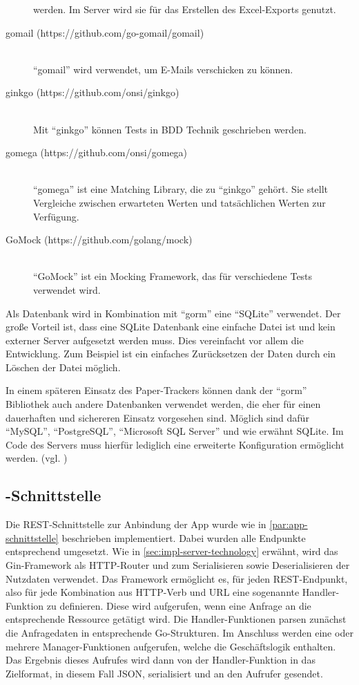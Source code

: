 \begin{description}
		werden. Im Server wird sie für das Erstellen des Excel-Exports genutzt.
	\item[gomail (https://github.com/go-gomail/gomail)] \hfill \\
		\enquote{gomail} wird verwendet, um E-Mails verschicken zu können.
	\item[ginkgo (https://github.com/onsi/ginkgo)] \hfill \\
		Mit \enquote{ginkgo} können Tests in \gls{BDD} Technik geschrieben werden.
	\item[gomega (https://github.com/onsi/gomega)] \hfill \\
		\enquote{gomega} ist eine Matching Library, die zu \enquote{ginkgo} gehört. Sie stellt Vergleiche zwischen erwarteten Werten und tatsächlichen Werten zur Verfügung.
	\item[GoMock (https://github.com/golang/mock)] \hfill \\
		\enquote{GoMock} ist ein Mocking Framework, das für verschiedene Tests verwendet wird.
\end{description}

Als Datenbank wird in Kombination mit \enquote{gorm} eine \enquote{SQLite} verwendet.
Der große Vorteil ist, dass eine SQLite Datenbank eine einfache Datei ist und kein externer Server aufgesetzt werden muss.
Dies vereinfacht vor allem die Entwicklung.
Zum Beispiel ist ein einfaches Zurücksetzen der Daten durch ein Löschen der Datei möglich.

In einem späteren Einsatz des Paper-Trackers können dank der \enquote{gorm} Bibliothek auch andere
Datenbanken verwendet werden, die eher für einen dauerhaften und sichereren Einsatz vorgesehen sind.
Möglich sind dafür \enquote{MySQL}, \enquote{PostgreSQL}, \enquote{Microsoft SQL Server} und wie erwähnt SQLite.
Im Code des Servers muss hierfür lediglich eine erweiterte Konfiguration ermöglicht werden. (vgl. \cite{Jinzhu2020})

\subsection{-Schnittstelle}

Die \gls{REST}-Schnittstelle zur Anbindung der App wurde wie in \autoref{par:app-schnittstelle}
beschrieben implementiert.
Dabei wurden alle Endpunkte entsprechend umgesetzt.
Wie in \autoref{sec:impl-server-technology} erwähnt, wird das Gin-Framework als
\gls{HTTP}-Router und zum Serialisieren sowie Deserialisieren der Nutzdaten verwendet.
Das Framework ermöglicht es, für jeden \gls{REST}-Endpunkt, also für jede Kombination aus
\gls{HTTP}-Verb und \gls{URL} eine sogenannte Handler-Funktion zu definieren. Diese wird aufgerufen,
wenn eine Anfrage an die entsprechende Ressource getätigt wird. Die Handler-Funktionen parsen
zunächst die Anfragedaten in entsprechende Go-Strukturen. Im Anschluss werden eine oder mehrere
Manager-Funktionen aufgerufen, welche die Geschäftslogik enthalten. Das Ergebnis dieses Aufrufes
wird dann von der Handler-Funktion in das Zielformat, in diesem Fall \gls{JSON}, serialisiert und an
den Aufrufer gesendet.

